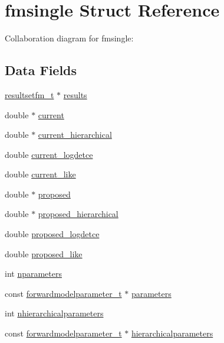 \hypertarget{structfmsingle}{}\section{fmsingle Struct Reference}
\label{structfmsingle}


Collaboration diagram for fmsingle\+:
\subsection*{Data Fields}
\begin{DoxyCompactItemize}
\item 
\hyperlink{resultsetfm_8h_a6d6d798339572d2abc96b66e97ea62ac}{resultsetfm\+\_\+t} $\ast$ \hyperlink{structfmsingle_a7264d52b1fa07698c747ce50c9b81553}{results}
\item 
double $\ast$ \hyperlink{structfmsingle_a3d260e319a4ddae6e4647835c0bd4071}{current}
\item 
double $\ast$ \hyperlink{structfmsingle_adc525ed1a81e4d7f5d687d96af6ce888}{current\+\_\+hierarchical}
\item 
double \hyperlink{structfmsingle_afa03012e995c260d955674113a36f2e5}{current\+\_\+logdetce}
\item 
double \hyperlink{structfmsingle_ace5bdca44f6db9697e6ccb4cc084b212}{current\+\_\+like}
\item 
double $\ast$ \hyperlink{structfmsingle_a70956154a388f5de33b0e9e8ccc6f172}{proposed}
\item 
double $\ast$ \hyperlink{structfmsingle_a920535078a203fc1c06c04b0c370ab26}{proposed\+\_\+hierarchical}
\item 
double \hyperlink{structfmsingle_a6f5f9b059e8099d77d4ad5c1ba0d9ebb}{proposed\+\_\+logdetce}
\item 
double \hyperlink{structfmsingle_a91bacb67e5d416c9210619c950f1cbb2}{proposed\+\_\+like}
\item 
int \hyperlink{structfmsingle_af08f6c83aca46c43c647e5ddb112e970}{nparameters}
\item 
const \hyperlink{forwardmodelparameter_8h_a18a7d2fd51fab097145725d83ac328e3}{forwardmodelparameter\+\_\+t} $\ast$ \hyperlink{structfmsingle_afee4062457521ceedd7fef33d3384ce5}{parameters}
\item 
int \hyperlink{structfmsingle_a5de749dceaf19fb0388f6c9749aa5e44}{nhierarchicalparameters}
\item 
const \hyperlink{forwardmodelparameter_8h_a18a7d2fd51fab097145725d83ac328e3}{forwardmodelparameter\+\_\+t} $\ast$ \hyperlink{structfmsingle_a7f7e040a5e4ad525258791dc802a8d7d}{hierarchicalparameters}

\end{DoxyCompactItemize}
